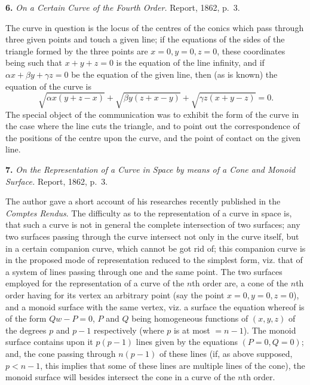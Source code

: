 \documentclass[11pt]{article}
\begin{document}
\medskip

\noindent\textbf{6.} \emph{On a Certain Curve of the Fourth Order.} Report, 1862, p.~3.

\medskip

The curve in question is the locus of the centres of the conics which pass through three given points and touch a given line; if the equations of the sides of the triangle formed by the three points are $x = 0, y = 0, z = 0$, these coordinates being such that $x + y + z = 0$ is the equation of the line infinity, and if $\alpha x + \beta y + \gamma z = 0$ be the equation of the given line, then (as is known) the equation of the curve is
\[ \sqrt{\alpha x(y + z - x)} + \sqrt{\beta y(z + x - y)} + \sqrt{\gamma z(x + y - z)} = 0. \]
The special object of the communication was to exhibit the form of the curve in the case where the line cuts the triangle, and to point out the correspondence of the positions of the centre upon the curve, and the point of contact on the given line.

\medskip

\noindent\textbf{7.} \emph{On the Representation of a Curve in Space by means of a Cone and Monoid Surface.} Report, 1862, p.~3.

\medskip

The author gave a short account of his researches recently published in the \emph{Comptes Rendus}. The difficulty as to the representation of a curve in space is, that such a curve is not in general the complete intersection of two surfaces; any two surfaces passing through the curve intersect not only in the curve itself, but in a certain companion curve, which cannot be got rid of; this companion curve is in the proposed mode of representation reduced to the simplest form, viz. that of a system of lines passing through one and the same point. The two surfaces employed for the representation of a curve of the $n$th order are, a cone of the $n$th order having for its vertex an arbitrary point (say the point $x = 0, y = 0, z = 0$), and a monoid surface with the same vertex, viz. a surface the equation whereof is of the form $Qw - P = 0$, $P$ and $Q$ being homogeneous functions of $(x, y, z)$ of the degrees $p$ and $p - 1$ respectively (where $p$ is at most $= n - 1$). The monoid surface contains upon it $p(p - 1)$ lines given by the equations $(P = 0, Q = 0)$; and, the cone passing through $n(p - 1)$ of these lines (if, as above supposed, $p < n - 1$, this implies that some of these lines are multiple lines of the cone), the monoid surface will besides intersect the cone in a curve of the $n$th order.
\end{document}
